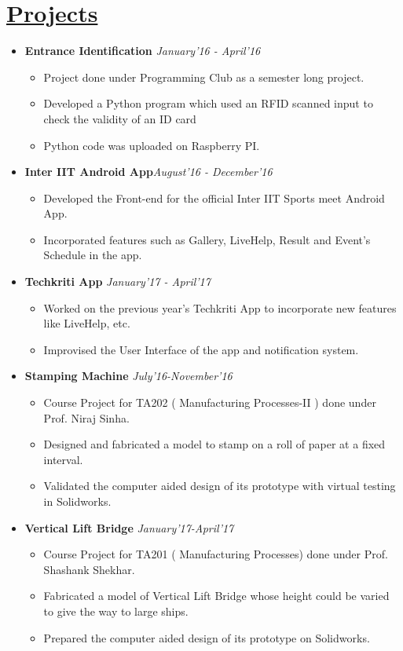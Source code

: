 \documentclass{article}
\begin{document}
\section*{\underline{Projects}}
\begin{itemize}
\item \textbf{Entrance Identification} \hfill\textit{January'16 - April'16}
\begin{itemize}
\item Project done under Programming Club as a semester long project. 
\item Developed a Python program which used an RFID scanned input to check the validity of an ID card
\item Python code was uploaded on Raspberry PI. 

\end{itemize}
\item \textbf{Inter IIT Android App}\hfill\textit{August'16 - December'16}
\begin{itemize}
\item Developed the Front-end for the official Inter IIT Sports meet Android App.
\item Incorporated features such as Gallery, LiveHelp, Result and Event's Schedule in the app. 
\end{itemize}
\item \textbf{Techkriti App} \hfill\textit{January'17 - April'17}
\begin{itemize}
\item Worked on the previous year's Techkriti App to incorporate new features like LiveHelp, etc.
\item Improvised the User Interface of the app and notification system. 
\end{itemize}
\item \textbf{Stamping Machine} \hfill\textit{July'16-November'16}
\begin{itemize}
\item Course Project for TA202 ( Manufacturing Processes-II ) done under Prof. Niraj Sinha.
\item Designed and fabricated a model to stamp on a roll of paper at a fixed interval.
\item Validated the computer aided design of its prototype with virtual testing in Solidworks.
\end{itemize}
\item \textbf{Vertical Lift Bridge} \hfill\textit{January'17-April'17}
\begin{itemize}
\item Course Project for TA201 ( Manufacturing Processes) done under Prof. Shashank Shekhar.
\item Fabricated a model of Vertical Lift Bridge whose height could be varied to give the way to large ships.
\item Prepared the computer aided design of its prototype on Solidworks.
\end{itemize}
\end{itemize}
\end{document}
